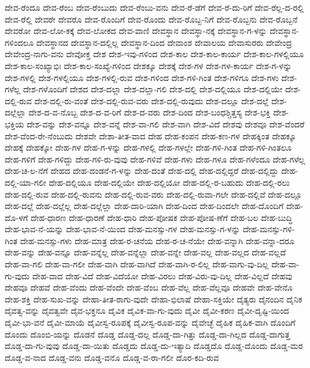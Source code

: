 {ದೇವ-ರೆಂದೂ
ದೇವ-ರೆಂಬ
ದೇವ-ರೆಂಬುದು
ದೇವ-ರೆಂಬು-ವನು
ದೇವ-ರೆ-ಡೆಗೆ
ದೇವ-ರೆ-ದು-ರಿಗೆ
ದೇವ-ರೆಲ್ಲ-ದ-ರಲ್ಲಿ
ದೇವ-ರೆಲ್ಲಿ
ದೇವರೇ
ದೇವರೊ
ದೇವ-ರೊಂದಿಗೆ
ದೇವ-ರೊಂದು
ದೇವ-ರೊಬ್ಬ-ನಿಗೆ
ದೇವ-ರೊಬ್ಬನು
ದೇವ-ರೊಬ್ಬನೆ
ದೇವರೋ
ದೇವ-ಲೋ-ಕಕ್ಕೆ
ದೇವ-ಲೋಕದ
ದೇವ-ವಾಣಿ
ದೇವಸ್ಥಾನ
ದೇವಸ್ಥಾ-ನಕ್ಕೆ
ದೇವಸ್ಥಾನ-ಗ-ಳನ್ನು
ದೇವಸ್ಥಾನ-ಗಳಿಂದಲೂ
ದೇವಸ್ಥಾನದ
ದೇವಸ್ಥಾನ-ದಲ್ಲಿಲ್ಲ
ದೇವಸ್ಥಾನ-ದಿಂದ
ದೇವಾಂಶ
ದೇವಾಲಯ
ದೇವಾಸುರರು
ದೇವೇಂದ್ರ
ದೇವೇಂದ್ರ-ನಾಗು-ವನು
ದೇವೋಕ್ತ
ದೇಶ
ದೇಶ-ಇವು-ಗಳಿಂದ
ದೇಶ-ಕಾಲ
ದೇಶ-ಕಾಲ-ಕಾರ್ಯ
ದೇಶ-ಕಾಲ-ಗಳಲ್ಲಿಯೂ
ದೇಶ-ಕಾಲ-ಸಂಖ್ಯಾಭಿಃ
ದೇಶ-ಕಾಲ-ಸಂಖ್ಯೆ-ಗಳಿಂದ
ದೇಶಕ್ಕೂ
ದೇಶಕ್ಕೆ
ದೇಶ-ಗಳ
ದೇಶ-ಗಳ-ಕಾರ್ಯ
ದೇಶ-ಗ-ಳನ್ನು
ದೇಶ-ಗಳಲ್ಲಿ
ದೇಶ-ಗಳಲ್ಲಿಯೂ
ದೇಶ-ಗಳಲ್ಲಿ-ರುವ
ದೇಶ-ಗಳಿಂದ
ದೇಶ-ಗಳಿ-ಗಿಂತ
ದೇಶ-ಗಳಿಗೂ
ದೇಶ-ಗಳು
ದೇಶ-ಗಳೆಲ್ಲ
ದೇಶ-ಗಳೊಂದಿಗೆ
ದೇಶದ
ದೇಶ-ದಲ್ಲಾ
ದೇಶ-ದಲ್ಲಾ-ಗಲಿ
ದೇಶ-ದಲ್ಲಿ
ದೇಶ-ದಲ್ಲಿಯೂ
ದೇಶ-ದಲ್ಲಿಯೇ
ದೇಶ-ದಲ್ಲಿ-ರುವ
ದೇಶ-ದಲ್ಲಿ-ರು-ವಂತೆ
ದೇಶ-ದಲ್ಲಿ-ರುವ-ವರು
ದೇಶ-ದಲ್ಲಿ-ರುವುದು
ದೇಶ-ದಲ್ಲೂ
ದೇಶ-ದಲ್ಲೆ
ದೇಶ-ದಲ್ಲೆಲ್ಲಾ
ದೇಶ-ದ-ವ-ನೊಬ್ಬ
ದೇಶ-ದ-ವ-ರಿಗೆ
ದೇಶ-ದ-ವರು
ದೇಶ-ದಿಂದ
ದೇಶ-ಬಂಧಶ್ಚಿತ್ತಸ್ಯ
ದೇಶ-ಭಕ್ತಿ
ದೇಶ-ಭಕ್ತಿಯ
ದೇಶ-ವನ್ನು
ದೇಶ-ವನ್ನೂ
ದೇಶ-ವನ್ನೆ
ದೇಶ-ವಾ-ಗಲಿ
ದೇಶ-ವಾಗಿ
ದೇಶ-ವಿದೆ
ದೇಶವು
ದೇಶವೂ
ದೇಶ-ವೆಂದರೆ
ದೇಶ-ವೆಂದ-ರೇ-ನೆಂಬುದು
ದೇಶವೇ
ದೇಶಾ-ತೀತ-ವಾದ
ದೇಹ
ದೇಹ-ಕಂಪನ
ದೇಹ-ಕಣ-ಗಳ
ದೇಹಕ್ಕಿಂತ
ದೇಹಕ್ಕೂ
ದೇಹಕ್ಕೆ
ದೇಹಕ್ಕೋ
ದೇಹ-ಗಳ
ದೇಹ-ಗ-ಳನ್ನು
ದೇಹ-ಗಳಲ್ಲಿ
ದೇಹ-ಗಳಲ್ಲೇ
ದೇಹ-ಗಳಿ-ಗಿಂತ
ದೇಹ-ಗಳಿ-ಗಿಂತಲೂ
ದೇಹ-ಗಳಿಗೆ
ದೇಹ-ಗಳಿದ್ದು
ದೇಹ-ಗಳಿ-ರು-ವುವು
ದೇಹ-ಗಳಿವೆ
ದೇಹ-ಗಳು
ದೇಹ-ಗಳೂ
ದೇಹ-ಗಳೆಂದೂ
ದೇಹ-ಗಳೆಲ್ಲ
ದೇಹ-ಚ-ಲ-ನೆಗೆ
ದೇಹದ
ದೇಹ-ದಂಡನೆ-ಗ-ಳನ್ನು
ದೇಹ-ದಂತೆ
ದೇಹ-ದಲ್ಲಿ
ದೇಹ-ದಲ್ಲಿದ್ದರೆ
ದೇಹ-ದಲ್ಲಿದ್ದು
ದೇಹ-ದಲ್ಲಿ-ಯಾ-ಗಲೀ
ದೇಹ-ದಲ್ಲಿಯೂ
ದೇಹ-ದಲ್ಲಿಯೇ
ದೇಹ-ದಲ್ಲಿಯೋ
ದೇಹ-ದಲ್ಲಿ-ರ-ಬಹುದು
ದೇಹ-ದಲ್ಲಿ-ರಲು
ದೇಹ-ದಲ್ಲಿ-ರುವ
ದೇಹ-ದಲ್ಲಿ-ರುವನು
ದೇಹ-ದಲ್ಲಿ-ರುವ-ವರು
ದೇಹ-ದಲ್ಲಿ-ರುವಾ-ಗಲೇ
ದೇಹ-ದಲ್ಲಿವೆ
ದೇಹ-ದಲ್ಲೂ
ದೇಹ-ದಲ್ಲೆ
ದೇಹ-ದಲ್ಲೆಲ್ಲ
ದೇಹ-ದಲ್ಲೆಲ್ಲಾ
ದೇಹ-ದಾರಿ-ಯಾಗಿ
ದೇಹ-ದಿಂದ
ದೇಹ-ದಿಂದಲೇ
ದೇಹ-ದೊಂದಿಗೆ
ದೇಹ-ದೊ-ಳಗೆ
ದೇಹ-ಧಾರಣ
ದೇಹ-ಧಾರಣೆ
ದೇಹ-ಧಾರಿ
ದೇಹ-ಪೋಷಕ
ದೇಹ-ಪೋಷ-ಣೆಗೆ
ದೇಹ-ಬಲ
ದೇಹ-ಬುದ್ಧಿ
ದೇಹ-ಭಾವ-ನೆ-ಯನ್ನು
ದೇಹ-ಭಾವ-ನೆ-ಯಿಂದ
ದೇಹ-ಮನಸ್ಸು-ಗಳ
ದೇಹ-ಮನಸ್ಸು-ಗ-ಳನ್ನು
ದೇಹ-ಮನಸ್ಸು-ಗಳಿ-ಗಿಂತ
ದೇಹ-ಮನಸ್ಸು-ಗಳು
ದೇಹ-ಮಾತ್ರ
ದೇಹ-ರ-ಚನೆಯ
ದೇಹ-ರ-ಚ-ನೆಯೇ
ದೇಹ-ವನ್ನಾಗಿ
ದೇಹ-ವನ್ನಾ-ದರೂ
ದೇಹ-ವನ್ನು
ದೇಹ-ವನ್ನೂ
ದೇಹ-ವನ್ನೆಲ್ಲ
ದೇಹ-ವನ್ನೆಲ್ಲಾ
ದೇಹ-ವನ್ನೇ
ದೇಹ-ವಲ್ಲ
ದೇಹ-ವಲ್ಲದ
ದೇಹ-ವಲ್ಲದೆ
ದೇಹ-ವಾ-ಗಲಿ
ದೇಹ-ವಾ-ಗಲೀ
ದೇಹ-ವಾಗಿ
ದೇಹ-ವಾಗಿದೆ
ದೇಹ-ವಾಗಿ-ರ-ಲಿಲ್ಲ
ದೇಹ-ವಾಗು-ವು-ದಿಲ್ಲ
ದೇಹ-ವಾ-ಗು-ವುದು
ದೇಹ-ವಾದ
ದೇಹ-ವಿದೆ
ದೇಹ-ವಿದೆಯೋ
ದೇಹ-ವಿರಲು
ದೇಹ-ವಿರು-ವು-ದಿಲ್ಲ
ದೇಹ-ವಿಲ್ಲದೆ
ದೇಹವು
ದೇಹವೂ
ದೇಹವೆ
ದೇಹ-ವೆಂದು
ದೇಹ-ವೆಂದೇ
ದೇಹ-ವೆಂಬ
ದೇಹ-ವೆಲ್ಲ
ದೇಹ-ವೆಲ್ಲವೂ
ದೇಹವೇ
ದೇಹ-ವೇನೊ
ದೇಹ-ಶಕ್ತಿ
ದೇಹ-ಸುಖ-ವನ್ನು
ದೇಹಾ-ತೀತ-ರಾಗು-ವುದೇ
ದೇಹಾ-ಭಿಲಾಷೆ
ದೇಹಾ-ಸಕ್ತಿಯೇ
ದೈತ್ಯರು
ದೈನಂದಿನ
ದೈನಿಕ
ದೈವತ್ವ-ವನ್ನು
ದೈವತ್ವವೇ
ದೈವ-ಭಕ್ತನೂ
ದೈವಿಕ
ದೈವಿಕ-ವಾ-ಗು-ವುದು
ದೈವೀ
ದೈವೀ-ಕರಣ
ದೈವೀ-ದೃಷ್ಟಿ-ಯಿಂದ
ದೈವೀ-ಭಾ-ವನೆ
ದೈವೀ-ಮಾಯೆ
ದೈವೀಸ್ವ-ರೂಪಕ್ಕೆ
ದೈವೀಸ್ವ-ರೂಪ-ವನ್ನು
ದೈವೇಚ್ಛೆ
ದೈಹಿಕ
ದೈಹಿಕ-ವಾಗಿ
ದೊಂದಿಗೆ
ದೊಂದು
ದೊಂಬಿ-ಯನ್ನು
ದೊಡನೆ
ದೊಡ್ಡ
ದೊಡ್ಡ-ದಲ್ಲ
ದೊಡ್ಡ-ದಾ-ಗಿತ್ತು
ದೊಡ್ಡ-ದಾ-ಗಿಲ್ಲದ
ದೊಡ್ಡ-ದಾಗುತ್ತ
ದೊಡ್ಡ-ದಾ-ಗು-ವುವು
ದೊಡ್ಡ-ದಾ-ಯಿತು
ದೊಡ್ಡದು
ದೊಡ್ಡ-ದು-ಇತ್ಯಾದಿ
ದೊಡ್ಡದೊ
ದೊಡ್ಡ-ದೊಂದು
ದೊಡ್ಡ-ಮರ
ದೊಡ್ಡ-ವ-ನಾದ
ದೊಡ್ಡ-ವನು
ದೊಡ್ಡ-ವನೊ
ದೊಡ್ಡ-ವ-ರಾ-ಗಲೀ
ದೊರ-ಕದಿ-ರುವ
}
